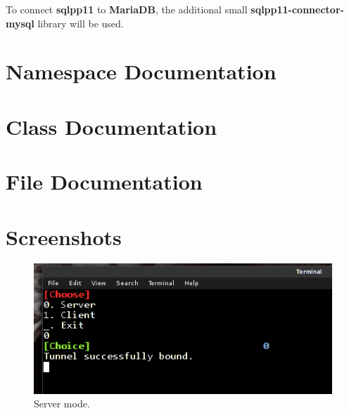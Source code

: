 \documentclass[11pt]{report}
\newcommand{\+}{\discretionary{\mbox{\scriptsize$\hookleftarrow$}}{}{}}
\renewcommand\emph{\textbf}
\begin{document}
            To connect \emph{sqlpp11} to \emph{MariaDB}, the additional small \emph{sqlpp11-connector-mysql} library will be used.
        
        \section{Namespace Documentation}
            
            
            
            
            

        \section{Class Documentation}
            
            
            

        \section{File Documentation}
            
        
        \section{Screenshots}
            
            \begin{figure}[!htb]
            \caption{Server mode.}
            \centering
            \includegraphics[width=1\textwidth]{screens/0.png}
            \end{figure}
\end{document}
